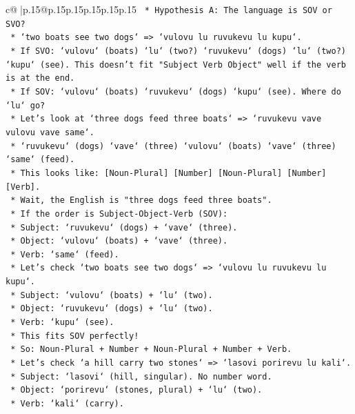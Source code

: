 \documentclass{article}
\begin{document}
{\begin{supertabular}{c@{$\;$}|p{.15\linewidth}@{}p{.15\linewidth}p{.15\linewidth}p{.15\linewidth}p{.15\linewidth}p{.15\linewidth}}
{{{\texttt{    *   Hypothesis A: The language is SOV or SVO?} \\
\texttt{        *   `two boats see two dogs` => `vulovu lu ruvukevu lu kupu`.} \\
\texttt{        *   If SVO: `vulovu` (boats) `lu` (two?) `ruvukevu` (dogs) `lu` (two?) `kupu` (see). This doesn't fit "Subject Verb Object" well if the verb is at the end.} \\
\texttt{        *   If SOV: `vulovu` (boats) `ruvukevu` (dogs) `kupu` (see). Where do `lu` go?} \\
\texttt{    *   Let's look at `three dogs feed three boats` => `ruvukevu vave vulovu vave same`.} \\
\texttt{        *   `ruvukevu` (dogs) `vave` (three) `vulovu` (boats) `vave` (three) `same` (feed).} \\
\texttt{        *   This looks like: {[}Noun{-}Plural{]} {[}Number{]} {[}Noun{-}Plural{]} {[}Number{]} {[}Verb{]}.} \\
\texttt{        *   Wait, the English is "three dogs feed three boats".} \\
\texttt{        *   If the order is Subject{-}Object{-}Verb (SOV):} \\
\texttt{            *   Subject: `ruvukevu` (dogs) + `vave` (three).} \\
\texttt{            *   Object: `vulovu` (boats) + `vave` (three).} \\
\texttt{            *   Verb: `same` (feed).} \\
\texttt{        *   Let's check `two boats see two dogs` => `vulovu lu ruvukevu lu kupu`.} \\
\texttt{            *   Subject: `vulovu` (boats) + `lu` (two).} \\
\texttt{            *   Object: `ruvukevu` (dogs) + `lu` (two).} \\
\texttt{            *   Verb: `kupu` (see).} \\
\texttt{        *   This fits SOV perfectly!} \\
\texttt{        *   So: Noun{-}Plural + Number + Noun{-}Plural + Number + Verb.} \\
\texttt{    *   Let's check `a hill carry two stones` => `lasovi porirevu lu kali`.} \\
\texttt{        *   Subject: `lasovi` (hill, singular). No number word.} \\
\texttt{        *   Object: `porirevu` (stones, plural) + `lu` (two).} \\
\texttt{        *   Verb: `kali` (carry).} \\
}}}
\end{supertabular}}
\end{document}
